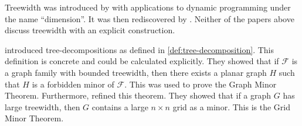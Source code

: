 Treewidth was introduced by \textcite{berteleChapterEliminationVariables1972} with applications to dynamic programming under the name ``dimension''. It was then rediscovered by \textcite{halinSfunctionsGraphs1976}. Neither of the papers above discuss treewidth with an explicit construction.

\textcite{robertsonGraphMinorsIII1984} introduced tree-decompositions as defined in \cref{def:tree-decomposition}. This definition is concrete and could be calculated explicitly. They showed that if $\mathcal{F}$ is a graph family with bounded treewidth, then there exists a planar graph $H$ such that $H$ is a forbidden minor of $\mathcal{F}$. This was used to prove the Graph Minor Theorem. Furthermore, \textcite{robertsonQuicklyExcludingPlanar1994} refined this theorem. They showed that if a graph $G$ has large treewidth, then $G$ contains a large $n \times n$ grid as a minor. This is the Grid Minor Theorem.